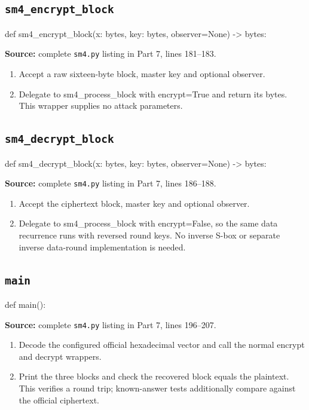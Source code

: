 \subsection{\texttt{sm4\_\allowbreak{}encrypt\_\allowbreak{}block}}
\begin{lightcode}
def sm4_encrypt_block(x: bytes, key: bytes, observer=None) -> bytes:
\end{lightcode}
\noindent\textbf{Source:} complete \texttt{sm4.py} listing in Part 7, lines 181--183.
\begin{enumerate}
\item Accept a raw sixteen-byte block, master key and optional observer.
\item Delegate to sm4\_process\_block with encrypt=True and return its bytes. This wrapper supplies no attack parameters.
\end{enumerate}
\subsection{\texttt{sm4\_\allowbreak{}decrypt\_\allowbreak{}block}}
\begin{lightcode}
def sm4_decrypt_block(x: bytes, key: bytes, observer=None) -> bytes:
\end{lightcode}
\noindent\textbf{Source:} complete \texttt{sm4.py} listing in Part 7, lines 186--188.
\begin{enumerate}
\item Accept the ciphertext block, master key and optional observer.
\item Delegate to sm4\_process\_block with encrypt=False, so the same data recurrence runs with reversed round keys. No inverse S-box or separate inverse data-round implementation is needed.
\end{enumerate}
\subsection{\texttt{main}}
\begin{lightcode}
def main():
\end{lightcode}
\noindent\textbf{Source:} complete \texttt{sm4.py} listing in Part 7, lines 196--207.
\begin{enumerate}
\item Decode the configured official hexadecimal vector and call the normal encrypt and decrypt wrappers.
\item Print the three blocks and check the recovered block equals the plaintext. This verifies a round trip; known-answer tests additionally compare against the official ciphertext.
\end{enumerate}
